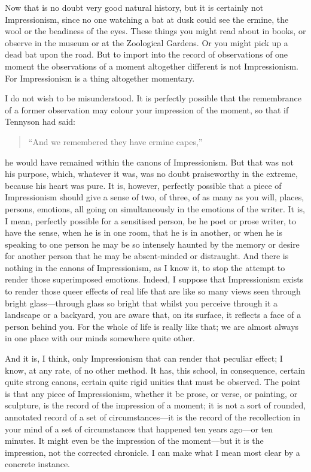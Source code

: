 Now that is no doubt very good natural history, but it is certainly not
Impressionism, since no one watching a bat at dusk could see the ermine,
the wool or the beadiness of the eyes. These things you might read about
in books, or observe in the museum or at the Zoological Gardens. Or you
might pick up a dead bat upon the road. But to import into the record of
observations of one moment the observations of a moment altogether
different is not Impressionism. For Impressionism is a thing altogether
momentary.

I do not wish to be misunderstood. It is perfectly possible that the
remembrance of a former observation may colour your impression of the
moment, so that if Tennyson had said:


\begin{verse} 

``And we remembered they have ermine capes,''


\end{verse} 

he would have remained within the canons of Impressionism. But that was
not his purpose, which, whatever it was, was no doubt praiseworthy in
the extreme, because his heart was pure. It is, however, perfectly
possible that a piece of Impressionism should give a sense of two, of
three, of as many as you will, places, persons, emotions, all going on
simultaneously in the emotions of the writer. It is, I mean, perfectly
possible for a sensitised person, be he poet or prose writer, to have
the sense, when he is in one room, that he is in another, or when he is
speaking to one person he may be so intensely haunted by the memory or
desire for another person that he may be absent-minded or distraught.
And there is nothing in the canons of Impressionism, as I know it, to
stop the attempt to render those superimposed emotions. Indeed, I
suppose that Impressionism exists to render those queer effects of real
life that are like so many views seen through bright glass---through
glass so bright that whilst you perceive through it a landscape or a
backyard, you are aware that, on its surface, it reflects a face of a
person behind you. For the whole of life is really like that; we are
almost always in one place with our minds somewhere quite other.

And it is, I think, only Impressionism that can render that peculiar
effect; I know, at any rate, of no other method. It has, this school, in
consequence, certain quite strong canons, certain quite rigid unities
that must be observed. The point is that any piece of Impressionism,
whether it be prose, or verse, or painting, or sculpture, is the record
of the impression of a moment; it is not a sort of rounded, annotated
record of a set of circumstances---it is the record of the recollection
in your mind of a set of circumstances that happened ten years ago---or
ten minutes. It might even be the impression of the moment---but it is
the impression, not the corrected chronicle. I can make what I mean most
clear by a concrete instance.

